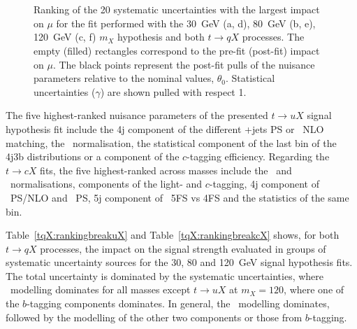 \begin{figure}[htb]
    \RawFloats
    \centering
    \\
    \\
    \caption{Ranking of the 20 systematic uncertainties with the largest impact on $\mu$ for the fit performed with the 30~GeV (a, d), 80~GeV (b, e), 120~GeV (c, f) $m_X$ hypothesis and both $t\to qX$ processes. The empty (filled) rectangles correspond  to the pre-fit (post-fit) impact on $\mu$. The black points represent the post-fit pulls of the nuisance parameters relative to the nominal values, $\theta_0$. Statistical uncertainties ($\gamma$) are shown pulled with respect 1.
    }
    \label{tqX:ranking3080120}
\end{figure}

The five highest-ranked nuisance parameters of the presented $t\to uX$ signal hypothesis fit include the 4j component of the different \ttbar+jets PS or \ttl\ NLO matching, the \ttc\ normalisation, the statistical component of the last bin of the 4j3b distributions or a component of the $c$-tagging efficiency. Regarding the $t\to cX$ fits, the five highest-ranked across masses include the \ttb\ and \ttc\ normalisations, components of the light- and $c$-tagging, 4j component of \ttb\ PS/NLO and \ttl\ PS, 5j component of \ttb\ 5FS vs 4FS and the statistics of the same bin.

Table~\ref{tqX:rankingbreakuX} and Table~\ref{tqX:rankingbreakcX} shows, for both $t\to qX$ processes, the impact on the signal strength evaluated in groups of systematic uncertainty sources for the 30, 80 and 120~GeV signal hypothesis fits. The total uncertainty is dominated by the systematic uncertainties, where \ttb\ modelling dominates for all masses except $t\to uX$ at $m_X=120$, where one of the $b$-tagging components dominates. In general, the \ttb\ modelling dominates, followed by the modelling of the other two components or those from $b$-tagging.

